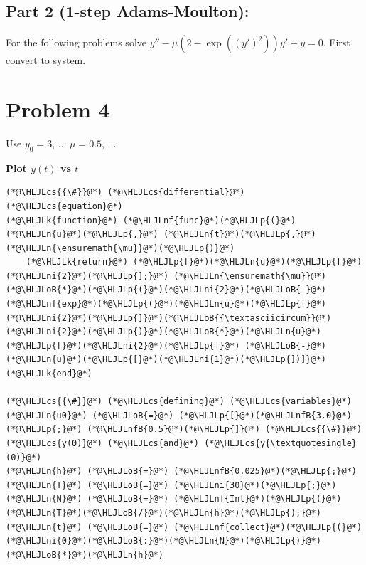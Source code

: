 \documentclass[12pt,a4paper]{article}
\newcommand{\HLJLk}[1]{\textcolor[RGB]{148,91,176}{\textbf{#1}}}
\newcommand{\HLJLn}[1]{#1}
\newcommand{\HLJLnf}[1]{\textcolor[RGB]{66,102,213}{#1}}
\newcommand{\HLJLnfB}[1]{\textcolor[RGB]{59,151,46}{#1}}
\newcommand{\HLJLni}[1]{\textcolor[RGB]{59,151,46}{#1}}
\newcommand{\HLJLoB}[1]{\textcolor[RGB]{102,102,102}{\textbf{#1}}}
\newcommand{\HLJLp}[1]{#1}
\newcommand{\HLJLcs}[1]{\textcolor[RGB]{153,153,119}{\textit{#1}}}
\begin{document}
\subsection{Part 2 (1-step Adams-Moulton):}
For the following problems solve $y''-\mu (2-\exp((y')^2))y'+y=0$. First convert to system.

\section{Problem 4}
Use $y_0 = 3$, ... $\mu = 0.5$, ...

\textbf{Plot $y(t)$ vs $t$}


\begin{lstlisting}
(*@\HLJLcs{{\#}}@*) (*@\HLJLcs{differential}@*) (*@\HLJLcs{equation}@*)
(*@\HLJLk{function}@*) (*@\HLJLnf{func}@*)(*@\HLJLp{(}@*)(*@\HLJLn{u}@*)(*@\HLJLp{,}@*) (*@\HLJLn{t}@*)(*@\HLJLp{,}@*) (*@\HLJLn{\ensuremath{\mu}}@*)(*@\HLJLp{)}@*)
    (*@\HLJLk{return}@*) (*@\HLJLp{[}@*)(*@\HLJLn{u}@*)(*@\HLJLp{[}@*)(*@\HLJLni{2}@*)(*@\HLJLp{];}@*) (*@\HLJLn{\ensuremath{\mu}}@*)(*@\HLJLoB{*}@*)(*@\HLJLp{(}@*)(*@\HLJLni{2}@*)(*@\HLJLoB{-}@*)(*@\HLJLnf{exp}@*)(*@\HLJLp{(}@*)(*@\HLJLn{u}@*)(*@\HLJLp{[}@*)(*@\HLJLni{2}@*)(*@\HLJLp{]}@*)(*@\HLJLoB{{\textasciicircum}}@*)(*@\HLJLni{2}@*)(*@\HLJLp{)}@*)(*@\HLJLoB{*}@*)(*@\HLJLn{u}@*)(*@\HLJLp{[}@*)(*@\HLJLni{2}@*)(*@\HLJLp{]}@*) (*@\HLJLoB{-}@*) (*@\HLJLn{u}@*)(*@\HLJLp{[}@*)(*@\HLJLni{1}@*)(*@\HLJLp{])]}@*)
(*@\HLJLk{end}@*)

(*@\HLJLcs{{\#}}@*) (*@\HLJLcs{defining}@*) (*@\HLJLcs{variables}@*)
(*@\HLJLn{u0}@*) (*@\HLJLoB{=}@*) (*@\HLJLp{[}@*)(*@\HLJLnfB{3.0}@*)(*@\HLJLp{;}@*) (*@\HLJLnfB{0.5}@*)(*@\HLJLp{]}@*) (*@\HLJLcs{{\#}}@*) (*@\HLJLcs{y(0)}@*) (*@\HLJLcs{and}@*) (*@\HLJLcs{y{\textquotesingle}(0)}@*)
(*@\HLJLn{h}@*) (*@\HLJLoB{=}@*) (*@\HLJLnfB{0.025}@*)(*@\HLJLp{;}@*) (*@\HLJLn{T}@*) (*@\HLJLoB{=}@*) (*@\HLJLni{30}@*)(*@\HLJLp{;}@*)
(*@\HLJLn{N}@*) (*@\HLJLoB{=}@*) (*@\HLJLnf{Int}@*)(*@\HLJLp{(}@*)(*@\HLJLn{T}@*)(*@\HLJLoB{/}@*)(*@\HLJLn{h}@*)(*@\HLJLp{);}@*)
(*@\HLJLn{t}@*) (*@\HLJLoB{=}@*) (*@\HLJLnf{collect}@*)(*@\HLJLp{(}@*)(*@\HLJLni{0}@*)(*@\HLJLoB{:}@*)(*@\HLJLn{N}@*)(*@\HLJLp{)}@*)(*@\HLJLoB{*}@*)(*@\HLJLn{h}@*)


\end{lstlisting}
\end{document}
